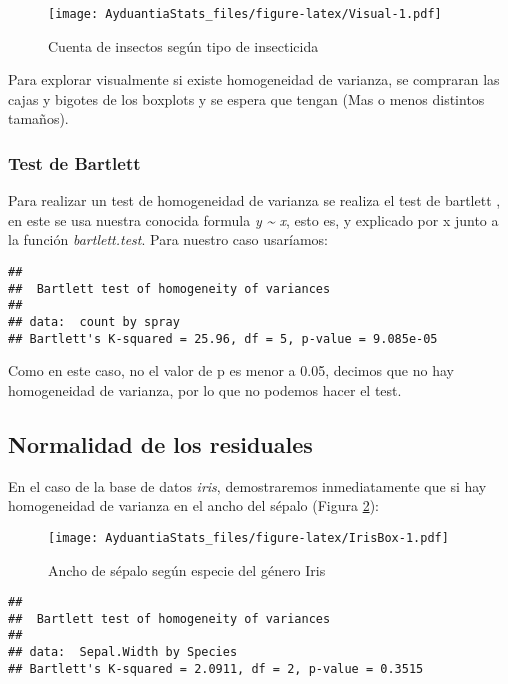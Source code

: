 \documentclass[]{book}
\begin{document}
\begin{figure}
\centering
\texttt{[image: AyduantiaStats\_files/figure-latex/Visual-1.pdf]}
\caption{\label{fig:Visual}Cuenta de insectos según tipo de insecticida}
\end{figure}

Para explorar visualmente si existe homogeneidad de varianza, se compraran las cajas y bigotes de los boxplots y se espera que tengan (Mas o menos distintos tamaños).

\hypertarget{test-de-bartlett}{%
\subsubsection{Test de Bartlett}\label{test-de-bartlett}}

Para realizar un test de homogeneidad de varianza se realiza el test de bartlett \citep{bartlett1937properties}, en este se usa nuestra conocida formula \emph{y \textasciitilde{} x}, esto es, y explicado por x junto a la función \emph{bartlett.test}. Para nuestro caso usaríamos:

\begin{verbatim}
## 
##  Bartlett test of homogeneity of variances
## 
## data:  count by spray
## Bartlett's K-squared = 25.96, df = 5, p-value = 9.085e-05
\end{verbatim}

Como en este caso, no el valor de p es menor a 0.05, decimos que no hay homogeneidad de varianza, por lo que no podemos hacer el test.

\hypertarget{normalidad-de-los-residuales}{%
\subsection{Normalidad de los residuales}\label{normalidad-de-los-residuales}}

En el caso de la base de datos \emph{iris}, demostraremos inmediatamente que si hay homogeneidad de varianza en el ancho del sépalo (Figura \ref{fig:IrisBox}):

\begin{figure}
\centering
\texttt{[image: AyduantiaStats\_files/figure-latex/IrisBox-1.pdf]}
\caption{\label{fig:IrisBox}Ancho de sépalo según especie del género Iris}
\end{figure}

\begin{verbatim}
## 
##  Bartlett test of homogeneity of variances
## 
## data:  Sepal.Width by Species
## Bartlett's K-squared = 2.0911, df = 2, p-value = 0.3515
\end{verbatim}
\end{document}
